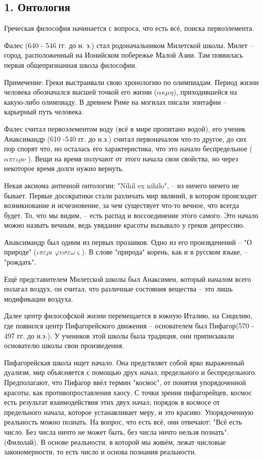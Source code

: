 \documentclass[a4paper, 12pt]{book} %
\begin{document}
\subsection*{1. Онтология}

Греческая философия начинается с вопроса, что есть всё, поиска первоэлемента.

Фалес (640 - 546 гг. до н. э.) стал родоначальником Милетской школы. Милет -- город, расположенный на Ионийском побережье Малой Азии. Там появилась первая общепризнанная школа философии.

Примечение: Греки выстраивали свою хронологию по олимпиадам. Период жизни человека обозначался высшей точкой его жизни ($\alpha \kappa \mu \eta$), приходившейся на какую-либо олимпиаду. В древнем Риме на могилах писали эпитафии -- карьерный путь человека.

Фалес считал первоэлементом воду (всё в мире пропитано водой), его ученик Анаксимандр (610 -540 гг. до н.э.) считал первоначалом что-то другое, до сих пор спорят что, но осталась его характеристика, что это начало беспредельное ($\alpha \pi \varepsilon \iota \rho \nu$ ). Вещи на время получают от этого начала свои свойства, но через некоторое время долги нужно вернуть.

Некая аксиома античной онтологии: "Nihil ex nihilo", -- из ничего ничего не бывает. Первые досократики стали различать мир являний, в котором происходит возникнование и исчезновение, за чем существует что-то вечное, что всегда будет. То, что мы видим, -- есть распад и воссоединение этого самого. Это начало можно назвать вечным, ведь увядание красоты вызывало у греков депрессию.

Анаксимандр был одинм из первых прозаиков. Одно из его произвденений -- "О природе" ($\iota \pi \varepsilon \rho \iota  $ $ \varphi \upsilon \sigma \varepsilon \omega \varsigma$). В слове "природа" корень, как и в русском языке, -- "рождать".

Ещё представителем Милетской школы был Анаксимен, который началом всего полагал воздух, он считал, что различные состояния вещества -- это лишь модификации воздуха. 

Далее центр философской жизни перемещается в южную Италию, на Сицилию, где появился центр Пифагорейского движения -- основателем был Пифагор(570 - 497 гг. до н.э.). У учеников этой школы была традиция, они приписывали основателю школы свои произведения.

Пифагорейская школа ищет начало. Она предствляет собой ярко выраженный дуализм, мир объясняется с помощью друх начал, предельного и беспредельного. Предполагают, что Пифагор ввёл термин "космос", от понятия упорядоченной красоты, как противопроставления хаосу. С точки зрения пифагорейцев, космос есть результат взаимодействия этих двух начал; порядок в космосе от предельного начала, которое устанавливает меру, и это красиво. Упорядоченную реальность можно познать. На вопрос, что есть всё, они отвечают: "Всё есть число. Без числа ничто не может быть, без числа ничто нельзя познать". (Филолай). В основе реальности, в которой мы живём, лежат числовые закономерности, то есть число и основа познания реальности.
\end{document}
